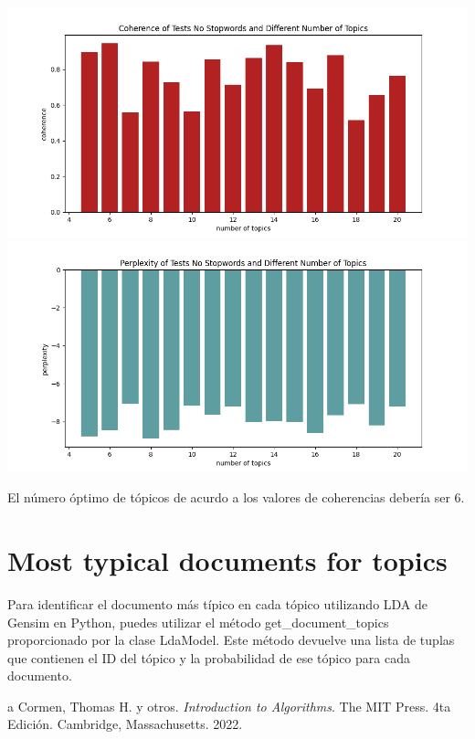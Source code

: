 \documentclass[10pt]{article} %
\begin{document}
	\begin{center}
		\includegraphics[scale=0.6]{images/coherence_no_stopwords_diff_n_topics}
		\includegraphics[scale=0.6]{images/perplexity_no_stopwords_diff_n_topics}
	\end{center}

	El n\'umero \'optimo de t\'opicos de acurdo a los valores de coherencias deber\'ia ser 6.
	
	
	\section{Most typical documents for topics}
	
	Para identificar el documento más típico en cada tópico utilizando LDA de Gensim en Python, puedes utilizar el método get\_document\_topics proporcionado por la clase LdaModel. Este método devuelve una lista de tuplas que contienen el ID del tópico y la probabilidad de ese tópico para cada documento.
	
	
	
	\begin{thebibliography}
		a
		 Cormen, Thomas H. y otros. \emph{Introduction to Algorithms}. 
		The MIT Press.
		4ta Edici\'on.		
		Cambridge, Massachusetts.
		2022.
	\end{thebibliography}
\end{document}
